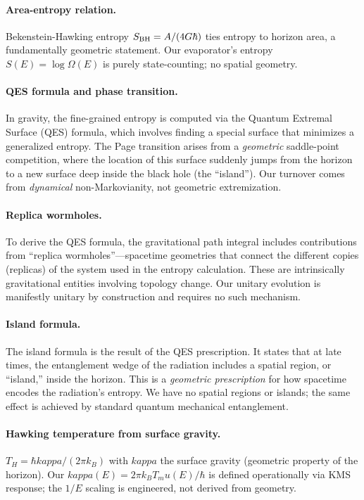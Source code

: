 \documentclass[aps,prx,onecolumn,showpacs,superscriptaddress,longbibliography,nofootinbib]{revtex4-2}
\def\kappa{kappa}%
\def\mu{mu}%
\begin{document}
\paragraph{Area-entropy relation.}
Bekenstein-Hawking entropy $S_{\rm BH} = A/(4G\hbar)$ ties entropy to horizon area, a fundamentally geometric statement. Our evaporator's entropy $S(E) = \log \Omega(E)$ is purely state-counting; no spatial geometry.

\paragraph{QES formula and phase transition.}
In gravity, the fine-grained entropy is computed via the Quantum Extremal Surface (QES) formula, which involves finding a special surface that minimizes a generalized entropy. The Page transition arises from a \emph{geometric} saddle-point competition, where the location of this surface suddenly jumps from the horizon to a new surface deep inside the black hole (the ``island''). Our turnover comes from \emph{dynamical} non-Markovianity, not geometric extremization.

\paragraph{Replica wormholes.}
To derive the QES formula, the gravitational path integral includes contributions from ``replica wormholes''---spacetime geometries that connect the different copies (replicas) of the system used in the entropy calculation. These are intrinsically gravitational entities involving topology change. Our unitary evolution is manifestly unitary by construction and requires no such mechanism.

\paragraph{Island formula.}
The island formula is the result of the QES prescription. It states that at late times, the entanglement wedge of the radiation includes a spatial region, or ``island,'' inside the horizon. This is a \emph{geometric prescription} for how spacetime encodes the radiation's entropy. We have no spatial regions or islands; the same effect is achieved by standard quantum mechanical entanglement.

\paragraph{Hawking temperature from surface gravity.}
$T_H = \hbar \kappa / (2\pi k_B)$ with $\kappa$ the surface gravity (geometric property of the horizon). Our $\kappa(E) = 2\pi k_B T_\mu(E)/\hbar$ is defined operationally via KMS response; the $1/E$ scaling is engineered, not derived from geometry.
\end{document}
